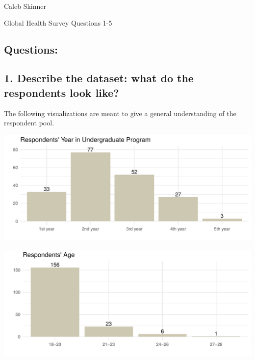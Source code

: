\documentclass[
  letterpaper,
  DIV=11,
  numbers=noendperiod]{scrartcl}
\author{}
\date{}
\begin{document}
\ifdefined\Shaded\renewenvironment{Shaded}{\begin{tcolorbox}[interior hidden, breakable, sharp corners, boxrule=0pt, borderline west={3pt}{0pt}{shadecolor}, enhanced, frame hidden]}{\end{tcolorbox}}\fi

Caleb Skinner

Global Health Survey Questions 1-5

\hypertarget{questions}{%
\subsection{Questions:}\label{questions}}

\hypertarget{describe-the-dataset-what-do-the-respondents-look-like}{%
\subsection{1. Describe the dataset: what do the respondents look
like?}\label{describe-the-dataset-what-do-the-respondents-look-like}}

The following visualizations are meant to give a general understanding
of the respondent pool.

\includegraphics{GlobalHealthQuarto1-5_files/figure-pdf/unnamed-chunk-2-1.pdf}

\includegraphics{GlobalHealthQuarto1-5_files/figure-pdf/unnamed-chunk-3-1.pdf}
\end{document}
